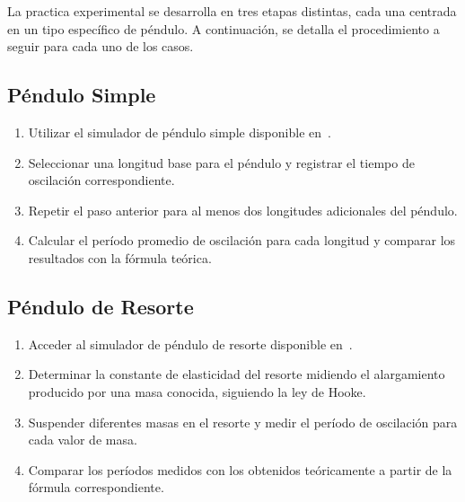 \documentclass[twocolumn, 12pt]{article}
\begin{document}
La practica experimental se desarrolla en tres etapas
distintas, cada una centrada en un tipo específico de
péndulo. A continuación, se detalla el procedimiento a
seguir para cada uno de los casos.

\subsection{Péndulo Simple}

\begin{enumerate}
    \item Utilizar el simulador de péndulo simple disponible
          en~\cite{simulador-pendulo-simple}.

    \item Seleccionar una longitud base para el péndulo y registrar
          el tiempo de oscilación correspondiente.

    \item Repetir el paso anterior para al menos dos longitudes
          adicionales del péndulo.

    \item Calcular el período promedio de oscilación para cada
          longitud y comparar los resultados con la fórmula teórica.
\end{enumerate}

\subsection{Péndulo de Resorte}

\begin{enumerate}
    \item Acceder al simulador de péndulo de resorte disponible
          en~\cite{simulador-pendulo-resorte}.

    \item Determinar la constante de elasticidad del resorte midiendo
          el alargamiento producido por una masa conocida, siguiendo
          la ley de Hooke.

    \item Suspender diferentes masas en el resorte y medir el período
          de oscilación para cada valor de masa.

    \item Comparar los períodos medidos con los obtenidos
          teóricamente a partir de la fórmula correspondiente.
\end{enumerate}
\end{document}
